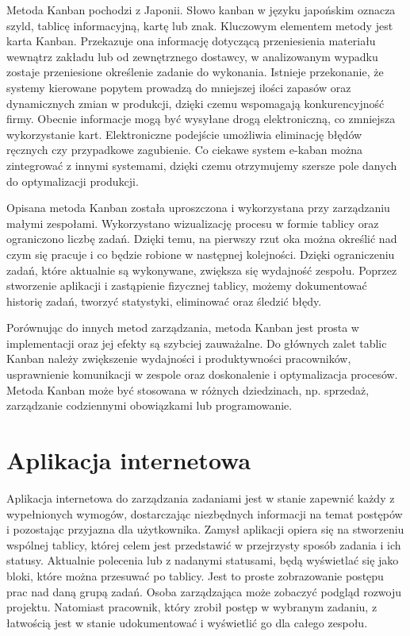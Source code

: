 \indent Metoda Kanban pochodzi z Japonii. Słowo kanban w języku japońskim oznacza szyld, tablicę informacyjną, kartę lub znak.  Kluczowym elementem metody jest karta Kanban. Przekazuje ona informację dotyczącą przeniesienia materiału wewnątrz zakładu lub od zewnętrznego dostawcy, w analizowanym wypadku zostaje przeniesione określenie zadanie do wykonania. Istnieje przekonanie, że systemy kierowane popytem prowadzą do mniejszej ilości zapasów oraz dynamicznych zmian w produkcji, dzięki czemu wspomagają konkurencyjność firmy. Obecnie informacje mogą być wysyłane drogą elektroniczną, co zmniejsza wykorzystanie kart. Elektroniczne podejście umożliwia eliminację błędów ręcznych czy przypadkowe zagubienie. Co ciekawe system e-kaban można zintegrować z innymi systemami, dzięki czemu otrzymujemy szersze pole danych do optymalizacji produkcji.


Opisana metoda Kanban została uproszczona i wykorzystana przy zarządzaniu małymi zespołami. Wykorzystano wizualizację procesu w formie tablicy oraz ograniczono liczbę zadań. Dzięki temu, na pierwszy rzut oka można określić nad czym się pracuje i co będzie robione w następnej kolejności. Dzięki ograniczeniu zadań, które aktualnie są wykonywane, zwiększa się wydajność zespołu. Poprzez stworzenie aplikacji i zastąpienie fizycznej tablicy, możemy dokumentować historię zadań, tworzyć statystyki, eliminować oraz śledzić błędy.


Porównując do innych metod zarządzania, metoda Kanban jest prosta w implementacji oraz jej efekty są szybciej zauważalne.  Do głównych zalet tablic Kanban należy zwiększenie wydajności i produktywności pracowników, usprawnienie komunikacji w zespole oraz doskonalenie i optymalizacja procesów. Metoda Kanban może być stosowana w różnych dziedzinach, np. sprzedaż, zarządzanie codziennymi obowiązkami lub programowanie.


\section{Aplikacja internetowa}

Aplikacja internetowa do zarządzania zadaniami jest w stanie zapewnić każdy z wypełnionych wymogów, dostarczając niezbędnych informacji na temat postępów i pozostając przyjazna dla użytkownika. Zamysł aplikacji opiera się na stworzeniu wspólnej tablicy, której celem jest przedstawić w przejrzysty sposób zadania i ich statusy. Aktualnie polecenia lub z nadanymi statusami, będą wyświetlać się jako bloki, które można przesuwać po tablicy. Jest to proste zobrazowanie postępu prac nad daną grupą zadań. Osoba zarządzająca może zobaczyć podgląd rozwoju projektu. Natomiast pracownik, który zrobił postęp w wybranym zadaniu, z łatwością jest w stanie udokumentować i wyświetlić go dla całego zespołu. 

